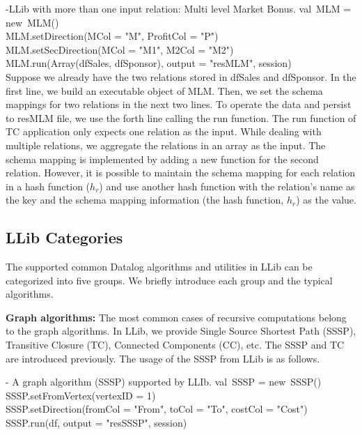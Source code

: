 \vspace{0.5em}
 -LLib with more than one input relation: Multi level Market Bonus.
\bldl
val\ MLM = new\ MLM() \\
MLM.setDirection(MCol = "M", ProfitCol = "P")\\
MLM.setSecDirection(MCol = "M1", M2Col = "M2") \\
MLM.run(Array(dfSales, dfSponsor), output = "resMLM", session) \\

\eldl
Suppose we already have the two relations stored in dfSales and dfSponsor. In the first line, we build an executable object of MLM. Then, we set the schema mappings for two relations in the next two lines. To operate the data and persist to resMLM file, we use the forth line calling the run function.  The run function of TC application only expects one relation as the input. While dealing with multiple relations, we aggregate the relations in an array as the input. The schema mapping is implemented by adding a new function for the second relation. However, it is possible to  maintain the schema mapping for each relation in a hash function ($h_r$) and use another hash function with the relation's name as the key and the schema mapping information (the hash function, $h_r$) as the value. 
\subsection{LLib Categories}
The supported common Datalog algorithms and utilities in LLib can be  categorized into five groups. We briefly introduce each group and the typical algorithms. 

\textbf{Graph algorithms:} The most common cases of recursive computations  belong to the graph algorithms. In LLib, we provide Single Source Shortest Path (SSSP), Transitive Closure (TC), Connected Components (CC), etc. The SSSP and TC are introduced previously.
The usage of the SSSP from LLib is as follows.

\vspace{0.5em}
 - A graph algorithm (SSSP) supported by LLIb.
\bldl
val\ SSSP = new\ SSSP() \\
SSSP.setFromVertex(vertexID = 1) \\
SSSP.setDirection(fromCol = "From", toCol = "To", costCol = "Cost") \\
SSSP.run(df, output = "resSSSP", session) \\

